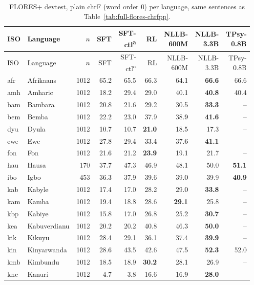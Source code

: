 {\footnotesize\setlength{\tabcolsep}{3pt}
\begin{longtable}{@{}llrrrrrrr@{}}
\caption{FLORES+ devtest, plain chrF (word order 0) per language, same sentences as Table~\ref{tab:full-flores-chrfpp}.}\label{tab:full-flores-chrf}\\
\toprule
ISO & Language & $n$ & SFT & SFT-ctl\textsuperscript{a} & RL & NLLB-600M & NLLB-3.3B & TPsy-0.8B \\
\midrule\endfirsthead
\toprule
ISO & Language & $n$ & SFT & SFT-ctl\textsuperscript{a} & RL & NLLB-600M & NLLB-3.3B & TPsy-0.8B \\
\midrule\endhead
\midrule\endfoot
\bottomrule\endlastfoot
afr & Afrikaans & 1012 & 65.2 & 65.5 & 66.3 & 64.1 & \textbf{66.6} & 66.6 \\
amh & Amharic & 1012 & 18.2 & 29.4 & 29.0 & 40.1 & \textbf{40.8} & 40.4 \\
bam & Bambara & 1012 & 20.8 & 21.6 & 29.2 & 30.5 & \textbf{33.3} & -- \\
bem & Bemba & 1012 & 22.2 & 23.0 & 37.9 & 38.9 & \textbf{41.6} & -- \\
dyu & Dyula & 1012 & 10.7 & 10.7 & \textbf{21.0} & 18.5 & 17.3 & -- \\
ewe & Ewe & 1012 & 27.8 & 29.4 & 33.4 & 37.6 & \textbf{41.1} & -- \\
fon & Fon & 1012 & 21.6 & 21.2 & \textbf{23.9} & 19.1 & 21.7 & -- \\
hau & Hausa & 170 & 37.7 & 47.3 & 46.9 & 48.1 & 50.0 & \textbf{51.1} \\
ibo & Igbo & 453 & 36.3 & 37.9 & 39.6 & 39.0 & 39.9 & \textbf{40.9} \\
kab & Kabyle & 1012 & 17.4 & 17.0 & 28.2 & 29.0 & \textbf{33.8} & -- \\
kam & Kamba & 1012 & 19.4 & 18.8 & 28.6 & \textbf{29.1} & 25.8 & -- \\
kbp & Kabiye & 1012 & 15.8 & 17.0 & 26.8 & 25.2 & \textbf{30.7} & -- \\
kea & Kabuverdianu & 1012 & 20.2 & 20.2 & 40.8 & 46.3 & \textbf{50.0} & -- \\
kik & Kikuyu & 1012 & 28.4 & 29.1 & 36.1 & 37.4 & \textbf{39.9} & -- \\
kin & Kinyarwanda & 1012 & 28.6 & 43.5 & 42.6 & 47.5 & \textbf{52.3} & 52.0 \\
kmb & Kimbundu & 1012 & 18.5 & 18.9 & \textbf{30.2} & 28.1 & 26.9 & -- \\
knc & Kanuri & 1012 & 4.7 & 3.8 & 16.6 & 16.9 & \textbf{28.0} & -- \\

\end{longtable}}
